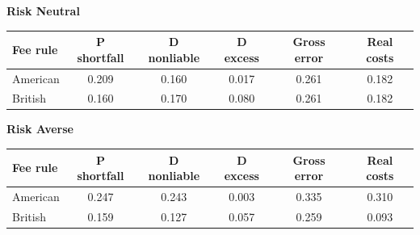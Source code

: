 \documentclass[10pt,border=5pt,varwidth=17cm]{standalone}
\begin{document}
\begingroup
\small
\setlength{\tabcolsep}{5pt}
\renewcommand{\arraystretch}{1.20}
\noindent\textbf{Risk Neutral}\par\smallskip
\noindent\begin{tabularx}{\linewidth}{@{}>{\raggedright\arraybackslash}Xccccc@{}}
\toprule
\textbf{Fee rule} & \textbf{P shortfall} & \textbf{D nonliable} & \textbf{D excess} & \textbf{Gross error} & \textbf{Real costs} \\
\midrule
American & 0.209 & 0.160 & 0.017 & 0.261 & 0.182 \\
British & 0.160 & 0.170 & 0.080 & 0.261 & 0.182 \\
\bottomrule\end{tabularx}\par\medskip
\noindent\textbf{Risk Averse}\par\smallskip
\noindent\begin{tabularx}{\linewidth}{@{}>{\raggedright\arraybackslash}Xccccc@{}}
\toprule
\textbf{Fee rule} & \textbf{P shortfall} & \textbf{D nonliable} & \textbf{D excess} & \textbf{Gross error} & \textbf{Real costs} \\
\midrule
American & 0.247 & 0.243 & 0.003 & 0.335 & 0.310 \\
British & 0.159 & 0.127 & 0.057 & 0.259 & 0.093 \\
\bottomrule\end{tabularx}\par\medskip
\endgroup
\end{document}
